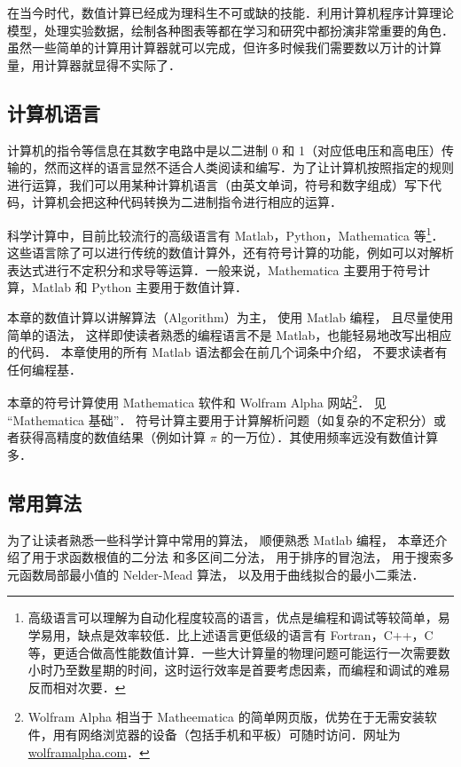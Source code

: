 
在当今时代，数值计算已经成为理科生不可或缺的技能．利用计算机程序计算理论模型，处理实验数据，绘制各种图表等都在学习和研究中都扮演非常重要的角色．虽然一些简单的计算用计算器就可以完成，但许多时候我们需要数以万计的计算量，用计算器就显得不实际了．

\subsection{计算机语言}
计算机的指令等信息在其数字电路中是以二进制 0 和 1（对应低电压和高电压）传输的，然而这样的语言显然不适合人类阅读和编写．为了让计算机按照指定的规则进行运算，我们可以用某种计算机语言（由英文单词，符号和数字组成）写下代码，计算机会把这种代码转换为二进制指令进行相应的运算．

科学计算中，目前比较流行的高级语言有 Matlab，Python，Mathematica 等\footnote{高级语言可以理解为自动化程度较高的语言，优点是编程和调试等较简单，易学易用，缺点是效率较低．比上述语言更低级的语言有 Fortran，C++，C 等，更适合做高性能数值计算．一些大计算量的物理问题可能运行一次需要数小时乃至数星期的时间，这时运行效率是首要考虑因素，而编程和调试的难易反而相对次要．}．这些语言除了可以进行传统的数值计算外，还有符号计算的功能，例如可以对解析表达式进行不定积分和求导等运算．一般来说，Mathematica 主要用于符号计算，Matlab 和 Python 主要用于数值计算．

本章的数值计算以讲解算法（Algorithm）为主， 使用 Matlab 编程， 且尽量使用简单的语法， 这样即使读者熟悉的编程语言不是 Matlab，也能轻易地改写出相应的代码． 本章使用的所有 Matlab 语法都会在前几个词条中介绍， 不要求读者有任何编程基．

本章的符号计算使用 Mathematica 软件和 Wolfram Alpha 网站\footnote{Wolfram Alpha 相当于 Matheematica 的简单网页版，优势在于无需安装软件，用有网络浏览器的设备（包括手机和平板）可随时访问．网址为 \href{https://www.wolframalpha.com/}{wolframalpha.com}．}． 见 “Mathematica 基础”．%
符号计算主要用于计算解析问题（如复杂的不定积分）或者获得高精度的数值结果（例如计算 $\pi$ 的一万位）．其使用频率远没有数值计算多．

\subsection{常用算法}
为了让读者熟悉一些科学计算中常用的算法， 顺便熟悉 Matlab 编程， 本章还介绍了用于求函数根值的二分法 和多区间二分法， 用于排序的冒泡法， 用于搜索多元函数局部最小值的 Nelder-Mead 算法， 以及用于曲线拟合的最小二乘法．%

